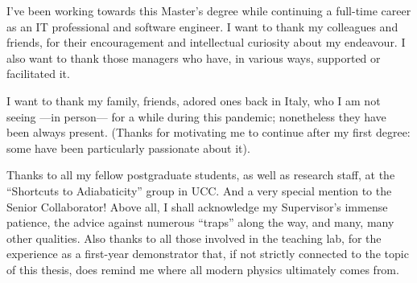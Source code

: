 {


  I've been working towards this Master's degree
  while continuing a full-time career
  as an IT professional and software engineer.
  I want to thank my
  colleagues and friends, for their encouragement
  and intellectual curiosity
  about my endeavour.
  I also want to thank those managers
  who have, in various ways, supported or facilitated it.

  I want to thank my family, friends, adored ones back in Italy,
  who I am not seeing ---in person--- for a while during this pandemic;
  nonetheless they have been always present.
  (Thanks for motivating me to continue after my first degree:
  some have been particularly passionate about it).
  
  Thanks to all my fellow postgraduate students,
  as well as research staff,
  at the ``Shortcuts to Adiabaticity'' group in UCC.
  And a very special mention to the Senior Collaborator!
  Above all, I shall acknowledge my Supervisor's immense patience,
  the advice against numerous ``traps'' along the way, and many, many other qualities.
  Also thanks to all those involved in the teaching lab, for the experience as a
  first-year demonstrator that,
  if not strictly connected to the topic of this thesis,
  does remind me where all modern physics ultimately comes from.
}
